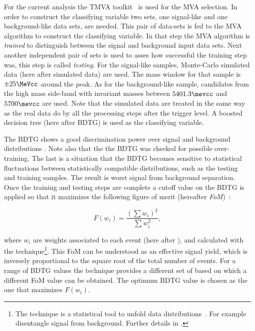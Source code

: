 For the current analysis the TMVA toolkit~\cite{TMVA} is used for the MVA selection. In order to construct the classifying variable
two sets, one signal-like and one background-like data sets, are needed. This pair of data-sets is fed to the MVA algorithm
to construct the classifying variable. In that step the MVA algorithm is {\it trained} to distinguish between the signal
and background input data sets. Next another independent pair of sets is used to asses how successful the training step was, this step is called {\it testing}.
For the signal-like samples, \BsJpsiKst Monte-Carlo simulated data (here after simulated data)
are used. The \Bs mass window for that sample is $\pm 25 \MeVcc$ around the \Bs peak. As for the background-like sample, candidates from the high mass side-band
with invariant masses between $5401.3\mevcc$ and $5700\mevcc$ are used. Note that the simulated data are treated in the same way as
the real data do by all the processing steps after the \lone trigger level. A boosted decision tree (here after BDTG) is used as the classifying variable.

The BDTG shows a good discrimination power over signal and background distributions . Note also that the the
BDTG was checked for possible over-training. The last is a situation that the BDTG becomes sensitive to statistical fluctuations between
statistically compatible distributions, such as the testing and training samples. The result is worst signal from background separation.
Once the training and testing steps are complete a cutoff value on the BDTG is applied so that it maximizes the following figure of merit
(hereafter {\it FoM})~\cite{Yuehong_fom}:

\begin{equation}
\label{eqn:fom}
F(w_i) = \frac{\left(\sum{w_{i}}\right)^2}{\sum{w_{i}^2}},
\end{equation}

\noindent where $w_i$ are weights associated to each event (here after \sWeights), and calculated with the \sPlot
technique\footnote{The \sPlot technique is a statistical tool to unfold data distributions~\cite{splot}.
For example disentangle signal from background. Further details in . }.
This FoM can be understood as an effective signal yield, which is inversely proportional to the square root of the total number of events.
For a range of BDTG values the \sPlot technique provides a different set of \sWeights based on which a different FoM value can be obtained.
The optimum BDTG value is chosen as the one that maximizes $F(w_i)$.

